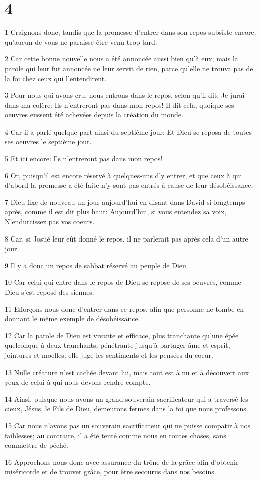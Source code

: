 \chapter{4}

\par 1 Craignons donc, tandis que la promesse d'entrer dans son repos subsiste encore, qu'aucun de vous ne paraisse être venu trop tard.
\par 2 Car cette bonne nouvelle nous a été annoncée aussi bien qu'à eux; mais la parole qui leur fut annoncée ne leur servit de rien, parce qu'elle ne trouva pas de la foi chez ceux qui l'entendirent.
\par 3 Pour nous qui avons cru, nous entrons dans le repos, selon qu'il dit: Je jurai dans ma colère: Ils n'entreront pas dans mon repos! Il dit cela, quoique ses oeuvres eussent été achevées depuis la création du monde.
\par 4 Car il a parlé quelque part ainsi du septième jour: Et Dieu se reposa de toutes ses oeuvres le septième jour.
\par 5 Et ici encore: Ils n'entreront pas dans mon repos!
\par 6 Or, puisqu'il est encore réservé à quelques-uns d'y entrer, et que ceux à qui d'abord la promesse a été faite n'y sont pas entrés à cause de leur désobéissance,
\par 7 Dieu fixe de nouveau un jour-aujourd'hui-en disant dans David si longtemps après, comme il est dit plus haut: Aujourd'hui, si vous entendez sa voix, N'endurcissez pas vos coeurs.
\par 8 Car, si Josué leur eût donné le repos, il ne parlerait pas après cela d'un autre jour.
\par 9 Il y a donc un repos de sabbat réservé au peuple de Dieu.
\par 10 Car celui qui entre dans le repos de Dieu se repose de ses oeuvres, comme Dieu s'est reposé des siennes.
\par 11 Efforçons-nous donc d'entrer dans ce repos, afin que personne ne tombe en donnant le même exemple de désobéissance.
\par 12 Car la parole de Dieu est vivante et efficace, plus tranchante qu'une épée quelconque à deux tranchants, pénétrante jusqu'à partager âme et esprit, jointures et moelles; elle juge les sentiments et les pensées du coeur.
\par 13 Nulle créature n'est cachée devant lui, mais tout est à nu et à découvert aux yeux de celui à qui nous devons rendre compte.
\par 14 Ainsi, puisque nous avons un grand souverain sacrificateur qui a traversé les cieux, Jésus, le Fils de Dieu, demeurons fermes dans la foi que nous professons.
\par 15 Car nous n'avons pas un souverain sacrificateur qui ne puisse compatir à nos faiblesses; au contraire, il a été tenté comme nous en toutes choses, sans commettre de péché.
\par 16 Approchons-nous donc avec assurance du trône de la grâce afin d'obtenir miséricorde et de trouver grâce, pour être secourus dans nos besoins.

